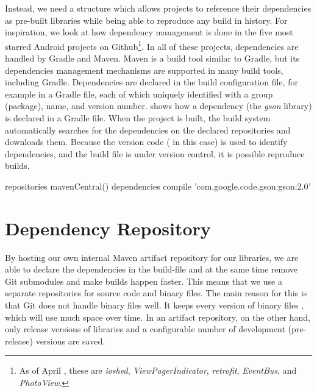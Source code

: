 Instead, we need a structure which allows projects to reference their dependencies as pre-built libraries while being able to reproduce any build in history. For inspiration, we look at how dependency management is done in the five most starred Android projects on Github\footnote{As of April , these are \emph{ioshed}, \emph{ViewPagerIndicator}, \emph{retrofit}, \emph{EventBus}, and \emph{PhotoView}.}. In all of these projects, dependencies are handled by Gradle and Maven. Maven is a build tool similar to Gradle, but its dependencies management mechanisms are supported in many build tools, including Gradle. Dependencies are declared in the build configuration file, for example in a Gradle file, each of which uniquely identified with a group (package), name, and version number.  shows how a dependency (the \emph{gson} library) is declared in a Gradle file. When the project is built, the build system automatically searches for the dependencies on the declared repositories and downloads them. Because the version code ( in this case) is used to identify dependencies, and the build file is under version control, it is possible reproduce builds.

\begin{gradlecode}[caption={Dependency declaration in Gradle},label={lst:dependency_declaration}]
repositories {
  mavenCentral()
}
dependencies {
  compile 'com.google.code.gson:gson:2.0'
}
\end{gradlecode}

\section{Dependency Repository}
By hosting our own internal Maven artifact repository for our libraries, we are able to declare the dependencies in the build-file and at the same time remove Git submodules and make builds happen faster. This means that we use a separate repositories for source code and binary files. The main reason for this is that Git does not handle binary files well. It keeps every version of binary files \parencite{gitwebsite_attributes}, which will use much space over time. In an artifact repository, on the other hand, only release versions of libraries and a configurable number of development (pre-release) versions are saved.

